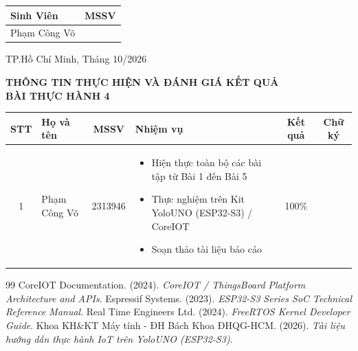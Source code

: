 \documentclass[a4paper]{article}
\begin{document}
\begin{titlepage}
\begin{center}
{\fontsize{13}{14}\selectfont
\begin{tabular}{|>{\centering\arraybackslash}p{7cm}|>{\centering\arraybackslash}p{4cm}|}
\hline
\textbf{Sinh Viên} & \textbf{MSSV} \\
\hline

Phạm Công Võ & 2313946 \\
\hline

\end{tabular}
}
\end{center}


\vspace{1.8cm}
\begin{center}
{\large TP.Hồ Chí Minh, Tháng 10/2026}
\end{center}
\end{titlepage}
\restoregeometry
\restoregeometry

\newpage
\begin{center}
    \textbf{\Large THÔNG TIN THỰC HIỆN VÀ ĐÁNH GIÁ KẾT QUẢ}\\[1ex]
    \textbf{\large BÀI THỰC HÀNH 4}
\end{center}

\vspace{1.5em}

\begin{longtable}{|c|m{4cm}|c|m{4.5cm}|c|c|}
\hline
\textbf{STT} & \textbf{\centering Họ và tên} & \textbf{MSSV} & \textbf{\centering Nhiệm vụ} & \textbf{Kết quả} & \textbf{Chữ ký} \\
\hline
1 & Phạm Công Võ & 2313946 & \begin{itemize}[leftmargin=*]
    \item Hiện thực toàn bộ các bài tập từ Bài 1 đến Bài 5
    \item Thực nghiệm trên Kit YoloUNO (ESP32-S3) / CoreIOT
    \item Soạn thảo tài liệu báo cáo
\end{itemize} & 100\% & \\
\hline
\end{longtable}

\newpage
\tableofcontents
\newpage



\newpage
{}
\begin{thebibliography}{99}
CoreIOT Documentation. (2024). \textit{CoreIOT / ThingsBoard Platform Architecture and APIs}.
Espressif Systems. (2023). \textit{ESP32-S3 Series SoC Technical Reference Manual}.
Real Time Engineers Ltd. (2024). \textit{FreeRTOS Kernel Developer Guide}.
Khoa KH\&KT Máy tính - ĐH Bách Khoa ĐHQG-HCM. (2026). \textit{Tài liệu hướng dẫn thực hành IoT trên YoloUNO (ESP32-S3)}.
\end{thebibliography}
\end{document}
